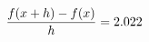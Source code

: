\documentclass[preview]{standalone}
\begin{document}
\begin{align*}
\special{dvisvgm:raw <g id='unique000'>}\frac{f(x+h)-f(x)}{h} = 2.022\special{dvisvgm:raw </g>}
\end{align*}
\end{document}

